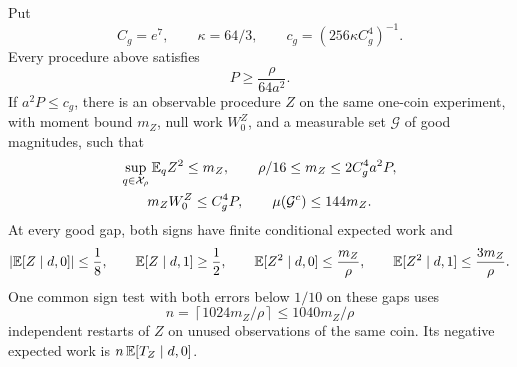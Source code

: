\begin{lemma}
\label{lem:information-gate}
Put
\[
 C_g=e^7,\qquad \kappa=64/3,\qquad
 c_g=(256\kappa C_g^4)^{-1}.
\]
Every procedure above satisfies
\begin{equation}
 P\ge\frac{\rho}{64a^2}.
 \label{eq:cross-baseline}
\end{equation}
If \(a^2P\le c_g\), there is an observable procedure \(Z\) on the same
one-coin experiment, with moment bound \(m_Z\), null work \(W_0^Z\), and
a measurable set \(\mathcal G\) of good magnitudes, such that
\begin{equation}
 \begin{gathered}
 \sup_{q\in\mathcal X_\rho}\mathbb E_qZ^2\le m_Z,\qquad
 \rho/16\le m_Z\le2C_g^4a^2P,\\
 m_ZW_0^Z\le C_g^4P,\qquad
 \mu(\mathcal G^c)\le144m_Z.
 \end{gathered}
 \label{eq:cross-gate-bounds}
\end{equation}
At every good gap, both signs have finite conditional expected work and
\begin{equation}
 \left|\mathbb E[Z\mid d,0]\right|\le\frac18,\qquad
 \mathbb E[Z\mid d,1]\ge\frac12,\qquad
 \mathbb E[Z^2\mid d,0]\le\frac{m_Z}{\rho},\qquad
 \mathbb E[Z^2\mid d,1]\le\frac{3m_Z}{\rho}.
 \label{eq:cross-gate-good}
\end{equation}
One common sign test with both errors below \(1/10\) on these gaps uses
\begin{equation}
 n=\left\lceil1024m_Z/\rho\right\rceil
 \le1040m_Z/\rho
 \label{eq:cross-gate-restarts}
\end{equation}
independent restarts of \(Z\) on unused observations of the same coin.
Its negative expected work is \(n\,\mathbb E[T_Z\mid d,0]\).
\end{lemma}


